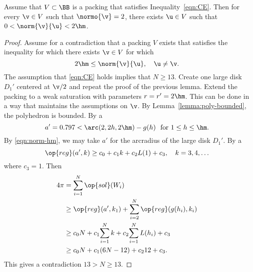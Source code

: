 \begin{cnl}
\begin{lemma}[]
\label{lemma:D'}  
%
Assume that $V\subset \BB$ is a packing that satisfies
Inequality~\ref{eqn:CE}.  Then for every $ \v\in V$ such that $\normo{
  \v}=2$, there exists $\u\in V$ such that $0<\norm{ \v}{ \u}< 2\hm$.
\end{lemma}


\begin{proof} Assume for a contradiction that a packing $V$ exists that
  satisfies the inequality for which there exists $\v\in V$ for which 
\begin{equation}\label{eqn:norm-hm}
2\hm\le\norm{\v}{\u},\quad \u\ne \v.
\end{equation}
The assumption that \eqref{eqn:CE} holds implies that $N\ge 13$.
Create one large disk $D_1'$ centered at $\v/2$ and repeat the proof
of the previous lemma.  Extend the packing to a  weak saturation
with parameters $r=r'=2\hm$.  This can be done in a way that maintains
the assumptions on $\v$.  By Lemma~\ref{lemma:poly-bounded}, the
polyhedron is bounded.  By a  %
\[ a'=0.797 < \arc(2,2h,2\hm)-g(h)\text{\ \ for } 1\le h \le \hm.\]  
By \eqref{eqn:norm-hm}, we may take $a'$
for the arcradius of the large disk $D_1'$.  
By a    %
\begin{equation}\label{eqn:alin2} 
\op{reg}(a',k) \ge c_0 + c_1 k + c_2 L(1) +
c_3,\quad k=3,4,\ldots\end{equation}
where
$c_3 =  1$.  %
Then 
\begin{align*} \label{eqn:D'}
4\pi &= \sumupto{i}{1}{N}{\op{sol}(W_i)}\\
&\ge \op{reg}(a',k_1)+\sumupto{i}{2}{N}{ \op{reg}(g(h_i),k_i)} \\
&\ge  c_0 N +c_1\sumupto{i}{1}{N}{k} + c_2 \sumupto{i}{1}{N}{L(h_i)} + c_3\\
&\ge c_0 N +c_1 (6N-12) + c_2 12 + c_3.
\end{align*}
This gives a contradiction
$13 > N \ge 13.$
\end{proof}

\end{cnl}


